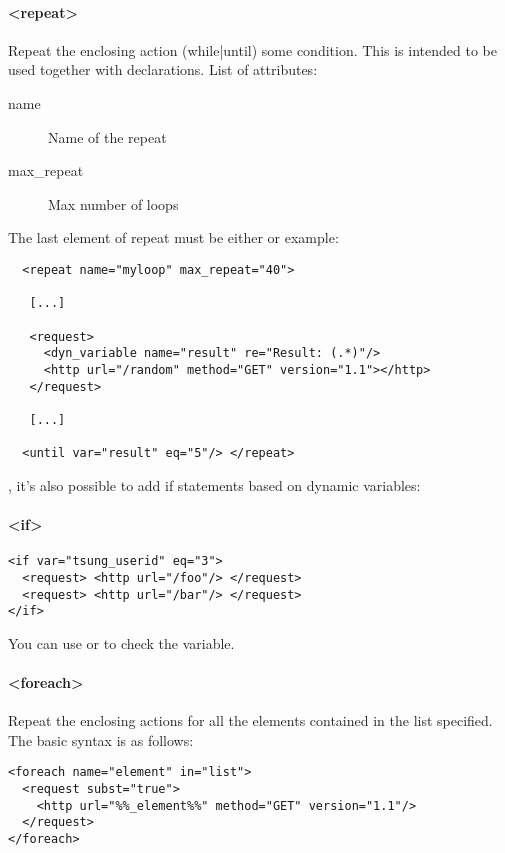 \documentclass{TSUNG-en}
\begin{document}
\paragraph{<repeat>}
Repeat the enclosing action (while|until) some condition. This is
intended to be used together with  declarations. List of
attributes:

\begin{description}
\item[name] Name of the repeat
\item[max\_repeat] Max number of loops
\end{description}

The last element of repeat must be either  or  example:
\begin{Verbatim}
  <repeat name="myloop" max_repeat="40">

   [...]

   <request>
     <dyn_variable name="result" re="Result: (.*)"/>
     <http url="/random" method="GET" version="1.1"></http>
   </request>

   [...]

  <until var="result" eq="5"/> </repeat>
\end{Verbatim}

, it's also possible to add if statements based on
dynamic variables:
\paragraph{<if>}

\begin{Verbatim}
<if var="tsung_userid" eq="3">  
  <request> <http url="/foo"/> </request>
  <request> <http url="/bar"/> </request>
</if>
\end{Verbatim}

You can use  or  to check the variable.

\paragraph{<foreach>}

Repeat the enclosing actions for all the elements contained in the list specified. The basic syntax is as follows:

\begin{Verbatim}
<foreach name="element" in="list">
  <request subst="true">
    <http url="%%_element%%" method="GET" version="1.1"/>
  </request>
</foreach>
\end{Verbatim}
\end{document}

